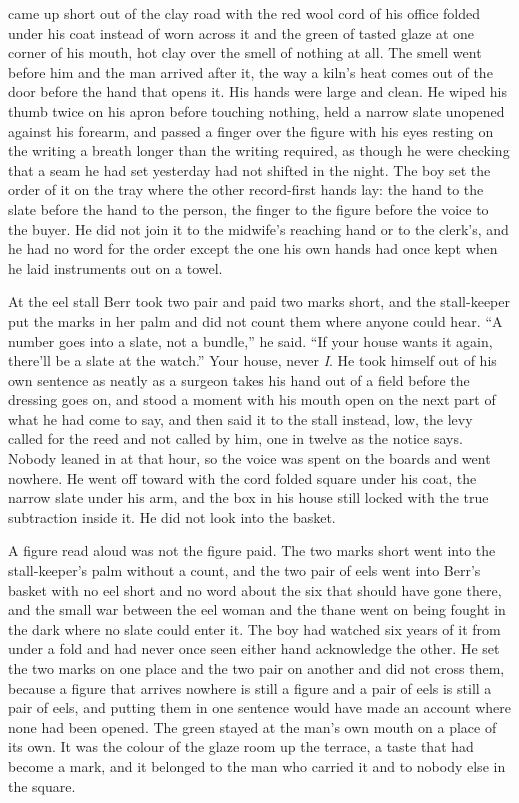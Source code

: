  came up short out of the clay road with the red wool cord of his office folded under his coat instead of worn across it and the green of tasted glaze at one corner of his mouth, hot clay over the smell of nothing at all. The smell went before him and the man arrived after it, the way a kiln's heat comes out of the door before the hand that opens it. His hands were large and clean. He wiped his thumb twice on his apron before touching nothing, held a narrow slate unopened against his forearm, and passed a finger over the figure with his eyes resting on the writing a breath longer than the writing required, as though he were checking that a seam he had set yesterday had not shifted in the night. The boy set the order of it on the tray where the other record-first hands lay: the hand to the slate before the hand to the person, the finger to the figure before the voice to the buyer. He did not join it to the midwife's reaching hand or to the clerk's, and he had no word for the order except the one his own hands had once kept when he laid instruments out on a towel.

At the eel stall Berr took two pair and paid two marks short, and the stall-keeper put the marks in her palm and did not count them where anyone could hear. “A number goes into a slate, not a bundle,” he said. “If your house wants it again, there'll be a slate at the watch.” Your house, never \emph{I}. He took himself out of his own sentence as neatly as a surgeon takes his hand out of a field before the dressing goes on, and stood a moment with his mouth open on the next part of what he had come to say, and then said it to the stall instead, low, the levy called for the reed and not called by him, one in twelve as the notice says. Nobody leaned in at that hour, so the voice was spent on the boards and went nowhere. He went off toward  with the cord folded square under his coat, the narrow slate under his arm, and the box in his house still locked with the true subtraction inside it. He did not look into the basket.

A figure read aloud was not the figure paid. The two marks short went into the stall-keeper's palm without a count, and the two pair of eels went into Berr's basket with no eel short and no word about the six that should have gone there, and the small war between the eel woman and the thane went on being fought in the dark where no slate could enter it. The boy had watched six years of it from under a fold and had never once seen either hand acknowledge the other. He set the two marks on one place and the two pair on another and did not cross them, because a figure that arrives nowhere is still a figure and a pair of eels is still a pair of eels, and putting them in one sentence would have made an account where none had been opened. The green stayed at the man's own mouth on a place of its own. It was the colour of the glaze room up the terrace, a taste that had become a mark, and it belonged to the man who carried it and to nobody else in the square.

